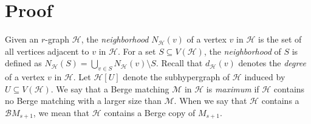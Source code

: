 \documentclass[11pt]{article}
\numberwithin{equation}{section}
\newtheorem*{thm*}{Theorem}
\newcounter{cases}
\newcommand\cB{{\mathcal B}}
\newcommand\cH{{\mathcal H}}
\newcommand\cM{{\mathcal M}}
\begin{document}


\section{\normalsize Proof}\label{sec: berge exact}

Given an $r$-graph $\cH$, the \textit{neighborhood} $N_\cH(v)$ of a vertex $v$ in $\cH$ is the set of all vertices adjacent to $v$ in $\cH$. For a set $S\subseteq V(\cH)$, the \textit{neighborhood} of $S$ is defined as $N_\cH(S)=\bigcup_{v \in S} N_\cH(v)\setminus S$.
Recall that $d_{\cH}(v)$ denotes the \textit{degree} of a vertex $v$ in $\cH$.
Let $\cH[U]$ denote the subhypergraph of $\cH$ induced by $U\subseteq V(\cH)$.
We say that a Berge matching $\cM$ in $\cH$ is \textit{maximum} if $\cH$ contains no Berge matching with a larger size than $\cM$.
When we say that $\cH$ contains a $\mathcal{B}M_{s+1}$, we mean that $\cH$ contains a Berge copy of $M_{s+1}$.



\end{document}
